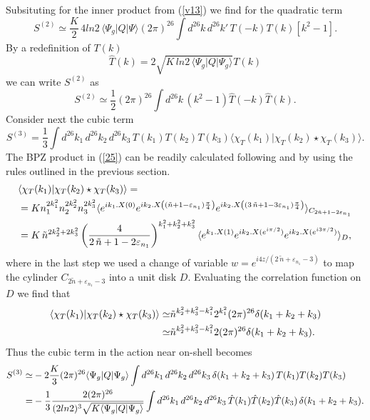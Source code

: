 \documentclass[a4paper,12pt]{article}
\begin{document}
Subsituting for the inner product from (\ref{v13}) we find for the quadratic
term
\begin{equation}
S^{(2)}\simeq\frac K2\, 4ln2\,
\langle\Psi_g|Q|\Psi\rangle (2\pi)^{26}
\int d^{26}k\, d^{26}k' \, T(-k)T(k)[k^2-1] .
\label{22}
\end{equation}
By a redefinition of $T(k)$
\begin{equation}
\hat T(k)=2\sqrt{K\,ln2\,\langle\Psi_g|Q|\Psi_g\rangle} T(k)
\label{24}
\end{equation}
we can write $S^{(2)}$ as
\begin{equation}
S^{(2)}\simeq\frac 12(2\pi)^{26}\int d^{26}k\, (k^2-1)\hat T(-k)\hat T(k) .
\label{23}
\end{equation}
Consider next the cubic term
\begin{equation}
S^{(3)}=
\frac 13\int d^{26}k_1\, d^{26}k_2\, d^{26}k_3 \, T(k_1)T(k_2)T(k_3)
\langle\chi_T(k_1)|\chi_T(k_2)\star\chi_T(k_3)\rangle .
\label{25}
\end{equation}
The BPZ product in (\ref{25}) can be readily calculated following
\cite{rsz1} and by using the rules outlined in the previous section.
\begin{align}
&\langle\chi_T(k_1)|\chi_T(k_2)\star\chi_T(k_3)\rangle=
\notag \\
&= Kn_1^{2k_1^2}n_2^{2k_2^2}n_3^{2k_3^2}\langle e^{ik_1.X(0)}
e^{ik_2.X\left((\tilde n+1-\varepsilon_{n_1})\frac{\pi}{4}\right)}
e^{ik_2.X\left((3\,\tilde n+1-3\varepsilon_{n_1})\frac{\pi}{4}\right)}
\rangle_{C_{2\tilde n +1-2\varepsilon_{n_1}}}
 \notag \\
&=K\,\tilde n^{2k_2^2+2k_3^2}
\left(\frac{4}{2\,\tilde n+1-2\varepsilon_{n_1}}\right)^{k_1^2+k_2^2+k_3^2}
\langle e^{k_1.X(1)}e^{ik_2.X(e^{i\pi/2})}e^{ik_2.X(e^{i3\pi/2})}
\rangle_D ,
\label{26}
\end{align}
where in the last step we  used a change of variable
$w=e^{i4z/(2\,\tilde n+\varepsilon_{n_1}-3)}$ to map the cylinder
$C_{2\tilde n +\varepsilon_{n_1}-3}$
into a unit disk $D$. Evaluating the correlation function
on $D$ we find that
\begin{align}
\langle\chi_T(k_1)|\chi_T(k_2)\star\chi_T(k_3)\rangle
\simeq & \tilde n^{k_2^2+k_3^2-k_1^2}2^{k_1^2}
(2\pi)^{26}\delta(k_1+k_2+k_3)
 \notag \\
\simeq & \tilde n^{k_2^2+k_3^2-k_1^2}2
(2\pi)^{26}\delta(k_1+k_2+k_3) .
\label{27}
\end{align}
Thus the cubic term in the action near on-shell becomes
\begin{align}
S^{(3)}\simeq&
-2\frac K3(2\pi)^{26}\langle\Psi_g|Q|\Psi_g\rangle
\int d^{26}k_1\, d^{26}k_2\, d^{26}k_3\, \delta(k_1+k_2+k_3)
\, T(k_1)T(k_2)T(k_3) \notag \\
=&-\frac 13\frac{2(2\pi)^{26}}{(2ln2)^3\sqrt{K\langle\Psi_g|Q|\Psi_g\rangle}}
\int d^{26}k_1\, d^{26}k_2\, d^{26}k_3\, \hat T(k_1)\hat T(k_2)\hat T(k_3)
\,\delta(k_1+k_2+k_3).
\label{28}
\end{align}
\end{document}
